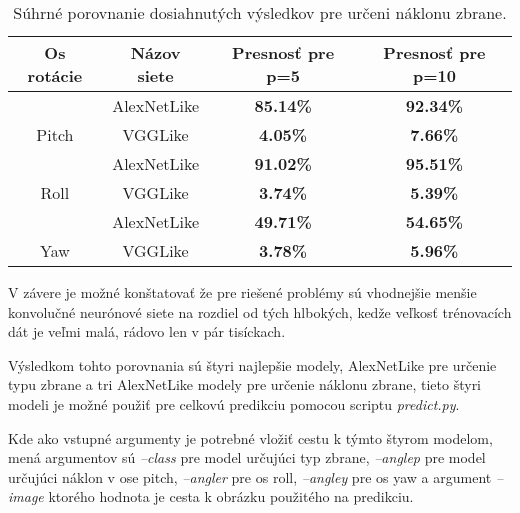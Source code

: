 \begin{table}[H]
    \centering
    \begin{tabular}{|c|c|c|c|}
        \hline
        {\color[HTML]{000000} Os rotácie}              & {\color[HTML]{000000} Názov siete} & {\color[HTML]{000000} Presnosť pre p=5} & {\color[HTML]{000000} Presnosť pre p=10} \\ \hline
        {\color[HTML]{000000} }                        & {\color[HTML]{000000} AlexNetLike} & {\color[HTML]{009901} \textbf{85.14\%}} & {\color[HTML]{009901} \textbf{92.34\%}}  \\
        \multirow{-2}{*}{{\color[HTML]{000000} Pitch}} & {\color[HTML]{000000} VGGLike}     & {\color[HTML]{9A0000} \textbf{4.05\%}}  & {\color[HTML]{9A0000} \textbf{7.66\%}}   \\ \hline
        {\color[HTML]{000000} }                        & {\color[HTML]{000000} AlexNetLike} & {\color[HTML]{009901} \textbf{91.02\%}} & {\color[HTML]{009901} \textbf{95.51\%}}  \\
        \multirow{-2}{*}{{\color[HTML]{000000} Roll}}  & {\color[HTML]{000000} VGGLike}     & {\color[HTML]{9A0000} \textbf{3.74\%}}  & {\color[HTML]{9A0000} \textbf{5.39\%}}   \\ \hline
        {\color[HTML]{000000} }                        & {\color[HTML]{000000} AlexNetLike} & {\color[HTML]{009901} \textbf{49.71\%}} & {\color[HTML]{009901} \textbf{54.65\%}}  \\
        \multirow{-2}{*}{{\color[HTML]{000000} Yaw}}   & {\color[HTML]{000000} VGGLike}     & {\color[HTML]{9A0000} \textbf{3.78\%}}  & {\color[HTML]{9A0000} \textbf{5.96\%}}   \\ \hline
    \end{tabular}
    \caption{Súhrné porovnanie dosiahnutých výsledkov pre určeni náklonu zbrane.}
    \label{tab:allresultsangle}
\end{table}

V závere je možné konštatovať že pre riešené problémy sú vhodnejšie menšie konvolučné neurónové siete na rozdiel od tých hlbokých, kedže
    veľkosť trénovacích dát je veľmi malá, rádovo len v pár tisíckach.

Výsledkom tohto porovnania sú štyri najlepšie modely, AlexNetLike pre určenie typu zbrane a tri AlexNetLike modely pre určenie náklonu zbrane,
    tieto štyri modeli je možné použiť pre celkovú predikciu pomocou scriptu \textit{predict.py}.

Kde ako vstupné argumenty je potrebné vložiť cestu k týmto štyrom modelom, mená argumentov sú \textit{--class} pre model určujúci typ zbrane,
    \textit{--anglep} pre model určujúci náklon v ose pitch, \textit{--angler} pre os roll, \textit{--angley} pre os yaw a argument
    \textit{--image} ktorého hodnota je cesta k obrázku použitého na predikciu.
